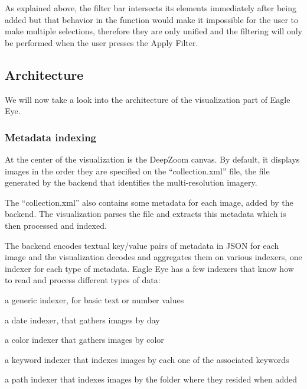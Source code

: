 As explained above, the filter bar intersects its elements immediately after being added but that behavior in the function would make it impossible for the user to make multiple selections, therefore they are only unified and the filtering will only be performed when the user presses the Apply Filter.




\subsection{Architecture}

We will now take a look into the architecture of the visualization part of Eagle Eye.


\subsubsection{Metadata indexing}

At the center of the visualization is the DeepZoom canvas. By default, it displays images in the order they are specified on the ``collection.xml'' file, the file generated by the backend that identifies the multi-resolution imagery.

The ``collection.xml'' also contains some metadata for each image, added by the backend. The visualization parses the file and extracts this metadata which is then processed and indexed.

The backend encodes textual key/value pairs of metadata in JSON for each image and the visualization decodes and aggregates them on various indexers, one indexer for each type of metadata. Eagle Eye has a few indexers that know how to read and process different types of data:
\begin{myitemize}
	\item{a generic indexer, for basic text or number values}
	\item{a date indexer, that gathers images by day}
	\item{a color indexer that gathers images by color}
	\item{a keyword indexer that indexes images by each one of the associated keywords}
	\item{a path indexer that indexes images by the folder where they resided when added}
\end{myitemize}

